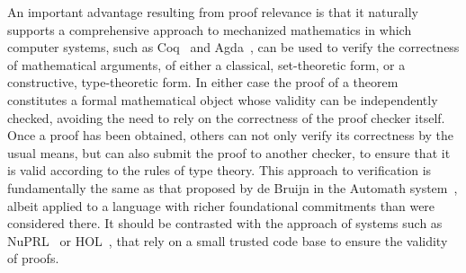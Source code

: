 \documentclass[11pt]{article}
\theoremstyle{remark}
\theoremstyle{definition}
\begin{document}
%
An important advantage resulting from proof relevance is that it naturally 
supports a comprehensive approach to mechanized mathematics in which computer systems, such as Coq~\cite{Coq}
and Agda~\cite{Agda}, can be used to verify the correctness of mathematical arguments, of either a classical, set-theoretic
form, or a constructive, type-theoretic form.  In either case the proof of a theorem constitutes a formal mathematical
object whose validity can be independently checked, avoiding the need to rely on the correctness of the proof checker
itself.  Once a proof has been obtained, others can not only verify its correctness by the usual means, but can also
submit the proof to another checker, to ensure that it is valid according to the rules of type theory. 
This approach to verification is fundamentally the same as that proposed by de Bruijn in the Automath
system~\cite{Automath}, albeit applied to a language with richer foundational commitments than were considered there.
It should be contrasted with the approach of systems such as NuPRL~\cite{NuPRL} or HOL~\cite{HOL,HOL-Light}, that rely
on a small trusted code base to ensure the validity of proofs.
\end{document}
